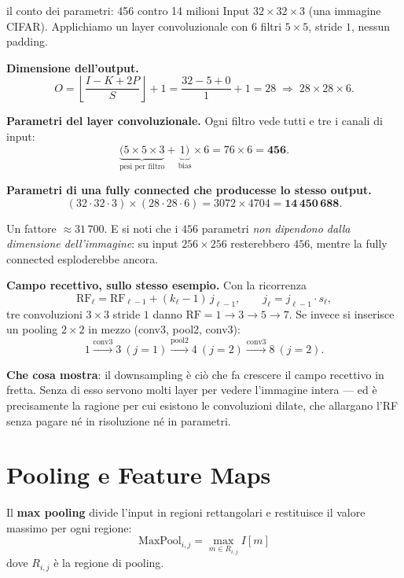 \begin{esempiosvolto}{il conto dei parametri: 456 contro 14 milioni}
Input $32 \times 32 \times 3$ (una immagine CIFAR). Applichiamo un layer convoluzionale con $6$ filtri $5 \times 5$, stride $1$, nessun padding.

\medskip
\textbf{Dimensione dell'output.}
\[
O = \left\lfloor \frac{I - K + 2P}{S} \right\rfloor + 1 = \frac{32 - 5 + 0}{1} + 1 = 28 \;\Rightarrow\; 28 \times 28 \times 6.
\]

\medskip
\textbf{Parametri del layer convoluzionale.} Ogni filtro vede tutti e tre i canali di input:
\[
\underbrace{(5 \times 5 \times 3}_{\text{pesi per filtro}} + \underbrace{1)}_{\text{bias}} \times 6 = 76 \times 6 = \mathbf{456}.
\]

\medskip
\textbf{Parametri di una fully connected che producesse lo stesso output.}
\[
(32 \cdot 32 \cdot 3) \times (28 \cdot 28 \cdot 6) = 3072 \times 4704 = \mathbf{14\,450\,688}.
\]

Un fattore $\approx 31\,700$. E si noti che i $456$ parametri \emph{non dipendono dalla dimensione dell'immagine}: su input $256 \times 256$ resterebbero $456$, mentre la fully connected esploderebbe ancora.

\medskip
\textbf{Campo recettivo, sullo stesso esempio.} Con la ricorrenza
\[
\text{RF}_\ell = \text{RF}_{\ell-1} + (k_\ell - 1)\, j_{\ell-1}, \qquad j_\ell = j_{\ell-1} \cdot s_\ell,
\]
tre convoluzioni $3\times 3$ stride $1$ danno $\text{RF} = 1 \to 3 \to 5 \to 7$. Se invece si inserisce un pooling $2\times 2$ in mezzo (conv3, pool2, conv3):
\[
1 \xrightarrow{\text{conv3}} 3 \ (j{=}1) \xrightarrow{\text{pool2}} 4 \ (j{=}2) \xrightarrow{\text{conv3}} 8 \ (j{=}2).
\]

\textbf{Che cosa mostra}: il downsampling è ciò che fa crescere il campo recettivo in fretta. Senza di esso servono molti layer per vedere l'immagine intera — ed è precisamente la ragione per cui esistono le convoluzioni dilate, che allargano l'RF senza pagare né in risoluzione né in parametri.
\end{esempiosvolto}

\section{Pooling e Feature Maps}

Il \textbf{max pooling} divide l'input in regioni rettangolari e restituisce il valore massimo per ogni regione:
\[
\text{MaxPool}_{i,j} = \max_{m \in R_{i,j}} I[m]
\]
dove $R_{i,j}$ è la regione di pooling.

